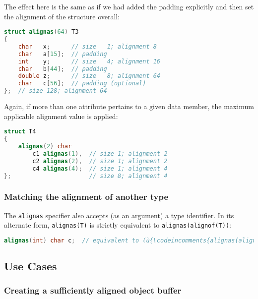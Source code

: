 \noindent The effect here is the same as if we had added the padding explicitly
and then set the alignment of the structure overall:

\begin{lstlisting}[language=C++]
struct alignas(64) T3
{
    char   x;      // size   1; alignment 8
    char   a[15];  // padding
    int    y;      // size   4; alignment 16
    char   b[44];  // padding
    double z;      // size   8; alignment 64
    char   c[56];  // padding (optional)
};  // size 128; alignment 64
\end{lstlisting}
    
\noindent Again, if more than one attribute pertains to a given data member,
the maximum applicable alignment value is applied:

\begin{lstlisting}[language=C++]
struct T4
{
    alignas(2) char
        c1 alignas(1),  // size 1; alignment 2
        c2 alignas(2),  // size 1; alignment 2
        c4 alignas(4);  // size 1; alignment 4
};                      // size 8; alignment 4
\end{lstlisting}
    

\subsubsection[Matching the alignment of another type]{Matching the alignment of another type}\label{matching-the-alignment-of-another-type}

The \texttt{alignas} specifier also accepts (as an argument) a type
identifier. In its alternate form, \texttt{alignas(T)} is strictly
equivalent to \texttt{alignas(alignof(T))}:

\begin{lstlisting}[language=C++]
alignas(int) char c;  // equivalent to (ù{\codeincomments{alignas(alignof(int)) char c;}}ù)
\end{lstlisting}
    

\subsection[Use Cases]{Use Cases}\label{alignas-use-cases}

\subsubsection[Creating a sufficiently aligned object buffer]{Creating a sufficiently aligned object buffer}\label{creating-a-sufficiently-aligned-object-buffer}

